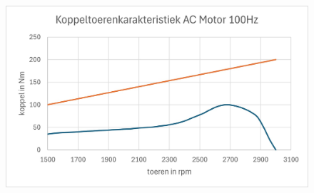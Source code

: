 \begin{enumerate}
        \begin{figure}[h]
            \centering
            \includegraphics[scale=0.6]{2e.jpg}
        \end{figure}

\end{enumerate}